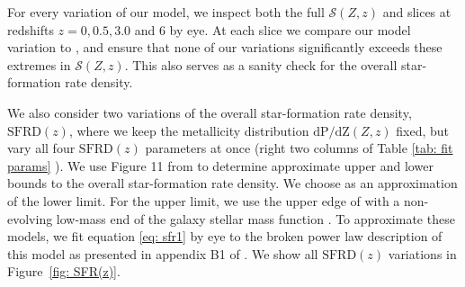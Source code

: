 \documentclass[linenumbers,twocolumn]{aastex631}
\newcommand{\SFRDzZ}{\ensuremath{\mathcal{S}(Z,z)}\xspace}
\newcommand{\SFRDz}{\ensuremath{\mathrm{SFRD}(z)}\xspace}
\newcommand{\dpdZ}{\ensuremath{\mathrm{dP/dZ}(Z,z)}\xspace}
\begin{document}
%

%

For every variation of our model, we inspect both the full \SFRDzZ and slices at redshifts $z = 0, 0.5, 3.0$ and $6$ by eye. At each slice we compare our model variation to , and ensure that none of our variations significantly exceeds these extremes in \SFRDzZ. This also serves as a sanity check for the overall star-formation rate density.


We also consider two variations of the overall star-formation rate density, \SFRDz, where we keep the metallicity distribution \dpdZ fixed, but vary all four \SFRDz parameters at once (right two columns of Table \ref{tab: fit params} ). 
We use Figure 11 from \cite{Chruslinska+2021} to determine approximate upper and lower bounds to the overall star-formation rate density. We choose \cite{Madau+2017} as an approximation of the lower limit. 
For the upper limit, we use the upper edge of 
with a non-evolving low-mass end of the galaxy stellar mass function \citep[shown as a thick brown line in Fig. 11 of ][and described in their table B1]{Chruslinska+2021}.
To approximate these models, we fit equation \ref{eq: sfr1} by eye to the broken power law description of this model as presented in appendix B1 of \cite{Chruslinska+2021}.
We show all \SFRDz variations in Figure~\ref{fig: SFR(z)}. \\
\end{document}
